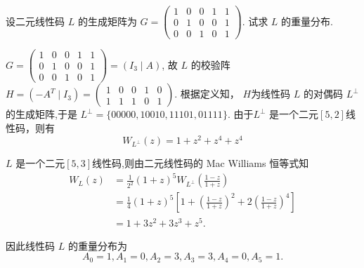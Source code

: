  \begin{tcolorbox}[breakable,colback=blue!5!white,colframe=blue!75!black,
 title= 解答题]

设二元线性码 $ L $ 的生成矩阵为
$
G=\left(\begin{array}{lllll}
1 & 0 & 0 & 1 & 1 \\
0 & 1 & 0 & 0 & 1 \\
0 & 0 & 1 & 0 & 1
\end{array}\right) .
$
试求 $ L $ 的重量分布.

\tcblower
$ G=\left(\begin{array}{lll|ll}
1 & 0 & 0 & 1 & 1 \\
0 & 1 & 0 & 0 & 1 \\
0 & 0 & 1 & 0 & 1
\end{array}\right)=\left(I_{3} \mid A\right) $, 故 $ L $ 的校验阵 $H= \left(-A^{T} \mid I_{3}\right)=\left(\begin{array}{lllll}1 & 0 & 0 & 1 & 0 \\ 1 & 1 & 1 & 0 & 1\end{array}\right)$. 根据定义知， $H$为线性码 $L$ 的对偶码 $L^{\perp}$的生成矩阵,于是 $ L^{\perp}=\{00000,10010,11101,01111\} $. 由于$L^{\perp}$ 是一个二元$[5,2]$线性码，则有
$$
W_{L^{\perp}}(z)=1+z^{2}+ z^{4}+z^{4}
$$

$L$ 是一个二元$[5,3]$线性码,则由二元线性码的 Mac Williams 恒等式知
$$
\begin{aligned}
W_{L}(z) & =\frac{1}{2^{2}}(1+z)^{5} W_{L^{\perp}}\left(\frac{1-z}{1+z}\right) \\
& =\frac{1}{4}(1+z)^{5}\left[1+\left(\frac{1-z}{1+z}\right)^{2}+2\left(\frac{1-z}{1+z}\right)^{4}\right] \\
& =1+3 z^{2}+3 z^{3}+z^{5} .
\end{aligned}
$$

因此线性码 $ L $ 的重量分布为
$$
A_{0}=1, A_{1}=0, A_{2}=3, A_{3}=3, A_{4}=0, A_{5}=1 .
$$
\end{tcolorbox}
